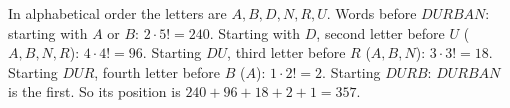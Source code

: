 In alphabetical order the letters are $A,B,D,N,R,U$. Words before $DURBAN$: starting with $A$ or $B$: $2\cdot5!=240$. Starting with $D$, second letter before $U$ ($A,B,N,R$): $4\cdot4!=96$. Starting $DU$, third letter before $R$ ($A,B,N$): $3\cdot3!=18$. Starting $DUR$, fourth letter before $B$ ($A$): $1\cdot2!=2$. Starting $DURB$: $DURBAN$ is the first. So its position is $240+96+18+2+1=\boxed{357}$.
